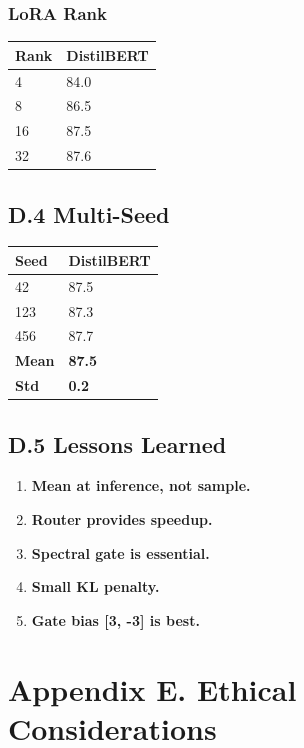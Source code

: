 \subsubsection{LoRA Rank}

\begin{table}[H]
\centering
\small
\begin{tabular}{ll}
\toprule
\textbf{Rank} & \textbf{DistilBERT} \\
\midrule
4 & 84.0 \\
8 & 86.5 \\
16 & 87.5 \\
32 & 87.6 \\
\bottomrule
\end{tabular}
\end{table}

\subsection{D.4 Multi-Seed}

\begin{table}[H]
\centering
\small
\begin{tabular}{ll}
\toprule
\textbf{Seed} & \textbf{DistilBERT} \\
\midrule
42 & 87.5 \\
123 & 87.3 \\
456 & 87.7 \\
\textbf{Mean} & \textbf{87.5} \\
\textbf{Std} & \textbf{0.2} \\
\bottomrule
\end{tabular}
\end{table}

\subsection{D.5 Lessons Learned}

\begin{enumerate}
\item \textbf{Mean at inference, not sample.}
\item \textbf{Router provides speedup.}
\item \textbf{Spectral gate is essential.}
\item \textbf{Small KL penalty.}
\item \textbf{Gate bias [3, -3] is best.}

\end{enumerate}


\section{Appendix E. Ethical Considerations}

